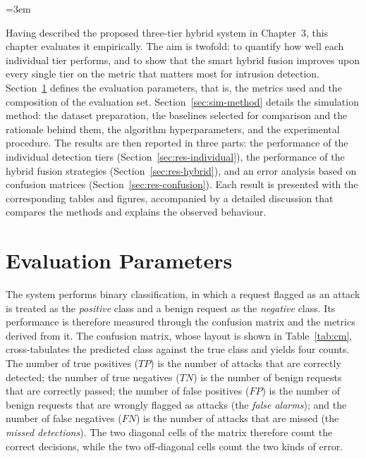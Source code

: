 \documentclass[../main.tex]{subfiles}
\begin{document}
\emergencystretch=3em
\renewcommand{\_}{\textunderscore\allowbreak}
\raggedbottom

Having described the proposed three-tier hybrid system in
Chapter~3, this chapter evaluates it empirically. The aim
is twofold: to quantify how well each individual tier performs, and to show
that the smart hybrid fusion improves upon every single tier on the metric
that matters most for intrusion detection. Section~\ref{sec:eval-params}
defines the evaluation parameters, that is, the metrics used and the
composition of the evaluation set. Section~\ref{sec:sim-method} details the
simulation method: the dataset preparation, the baselines selected for
comparison and the rationale behind them, the algorithm hyperparameters, and
the experimental procedure. The results are then reported in three parts:
the performance of the individual detection tiers
(Section~\ref{sec:res-individual}), the performance of the hybrid fusion
strategies (Section~\ref{sec:res-hybrid}), and an error analysis based on
confusion matrices (Section~\ref{sec:res-confusion}). Each result is
presented with the corresponding tables and figures, accompanied by a
detailed discussion that compares the methods and explains the observed
behaviour.

\section{Evaluation Parameters}
\label{sec:eval-params}

The system performs binary classification, in which a request flagged as an
attack is treated as the \emph{positive} class and a benign request as the
\emph{negative} class. Its performance is therefore measured through the
confusion matrix and the metrics derived from it. The confusion matrix, whose
layout is shown in Table~\ref{tab:cm}, cross-tabulates the predicted class
against the true class and yields four counts. The number of true positives
($TP$) is the number of attacks that are correctly detected; the number of
true negatives ($TN$) is the number of benign requests that are correctly
passed; the number of false positives ($FP$) is the number of benign requests
that are wrongly flagged as attacks (the \emph{false alarms}); and the number
of false negatives ($FN$) is the number of attacks that are missed (the
\emph{missed detections}). The two diagonal cells of the matrix therefore
count the correct decisions, while the two off-diagonal cells count the two
kinds of error.
\end{document}
